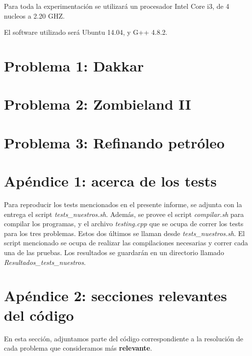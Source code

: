 \documentclass[a4paper]{article}
\begin{document}
Para toda la experimentación se utilizará un procesador Intel Core i3, de 4 nucleos a 2.20 GHZ.

El software utilizado será Ubuntu 14.04, y G++ 4.8.2.
\newpage
\section{Problema 1: Dakkar}


\newpage
\section{Problema 2: Zombieland II}


\newpage
\section{Problema 3: Refinando petróleo}



\newpage
\section{Apéndice 1: acerca de los tests}
Para reproducir los tests mencionados en el presente informe, se adjunta con la entrega el script {\it tests_nuestros.sh}.  Además, se provee el script {\it compilar.sh} para compilar los programas, y el archivo {\it testing.cpp} que se ocupa de correr los tests para los tres problemas.  Estos dos últimos se llaman desde {\it tests_nuestros.sh}.
El script mencionado se ocupa de realizar las compilaciones necesarias y correr cada una de las pruebas. Los resultados se guardarán en un directorio llamado {\it Resultados_tests_nuestros}.

\newpage
\section{Apéndice 2: secciones relevantes del código}
En esta sección, adjuntamos parte del código correspondiente a la resolución de cada problema que consideramos más \textbf{relevante}.
\end{document}
